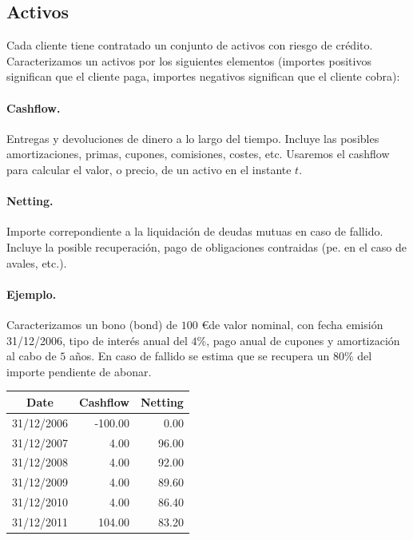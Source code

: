 \subsection{Activos}

Cada cliente tiene contratado un conjunto de activos con riesgo de cr\'edito.
Caracterizamos un activos por los siguientes elementos (importes positivos
significan que el cliente paga, importes negativos significan que el cliente 
cobra):

\paragraph{Cashflow.}  Entregas y devoluciones de dinero a lo largo
del tiempo. Incluye las posibles amortizaciones, primas, cupones, comisiones, costes,
etc. Usaremos el cashflow para calcular el valor, o precio, de un activo en el
instante $t$.

\paragraph{Netting.}  Importe correpondiente a la liquidaci\'on de
deudas mutuas en caso de fallido. Incluye la posible recuperaci\'on, pago de
obligaciones contraidas (pe. en el caso de avales, etc.).

\paragraph{Ejemplo.}
Caracterizamos un bono (bond) de $100$ \euro de valor nominal, con fecha emisi\'on
31/12/2006, tipo de inter\'es anual del $4\%$, pago anual de cupones y amortizaci\'on
al cabo de $5$ a\~nos. En caso de fallido se estima que se recupera un $80\%$ del
importe pendiente de abonar.\newline

\begin{center}
\begin{tabular}{c|r|r}
\textbf{Date} & \textbf{Cashflow} & \textbf{Netting} \\
\hline
31/12/2006 &  -100.00 &    0.00 \\
31/12/2007 &     4.00 &   96.00 \\
31/12/2008 &     4.00 &   92.00 \\
31/12/2009 &     4.00 &   89.60 \\
31/12/2010 &     4.00 &   86.40 \\
31/12/2011 &   104.00 &   83.20
\end{tabular}
\end{center}

